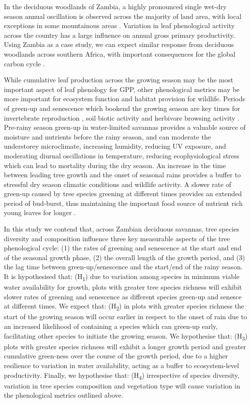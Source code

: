 \documentclass[11pt,a4paper]{article}
\begin{document}
In the deciduous woodlands of Zambia, a highly pronounced single wet-dry season annual oscillation is observed across the majority of land area, with local exceptions in some mountainous areas \citep{}. Variation in leaf phenological activity across the country has a large influence on annual gross primary productivity. Using Zambia as a case study, we can expect similar response from deciduous woodlands across southern Africa, with important consequences for the global carbon cycle \citep{}. 

While cumulative leaf production across the growing season may be the most important aspect of leaf phenology for GPP, other phenological metrics may be more important for ecosystem function and habitat provision for wildlife. Periods of green-up and senescence which bookend the growing season are key times for invertebrate reproduction \citep{}, soil biotic activity \citep{} and herbivore browsing activity \citep{}. Pre-rainy season green-up in water-limited savannas provides a valuable source of moisture and nutrients before the rainy season, and can moderate the understorey microclimate, increasing humidity, reducing UV exposure, and moderating diurnal oscillations in temperature, reducing ecophysiological stress which can lead to mortality during the dry season. An increase in the time between leading tree growth and the onset of seasonal rains provides a buffer to stressful dry season climatic conditions and wildlife activity. A slower rate of green-up caused by tree species greening at different times provides an extended period of bud-burst, thus maintaining the important food source of nutrient rich young leaves for longer \citep{}.
 
In this study we contend that, across Zambian deciduous savannas, tree species diversity and composition influence three key measurable aspects of the tree phenological cycle: (1) the rates of greening and senescence at the start and end of the seasonal growth phase, (2) the overall length of the growth period, and (3) the lag time between green-up/senescence and the start/end of the rainy season. It is hypothesised that: (H\textsubscript{1}) due to variation among species in minimum viable water availability for growth, plots with greater tree species richness will exhibit slower rates of greening and senescence as different species green-up and senesce at different times. We expect that: (H\textsubscript{2}) in plots with greater species richness the start of the growing season will occur earlier in respect to the onset of rain due to an increased likelihood of containing a species which can green-up early, facilitating other species to initiate the growing season. We hypothesise that: (H\textsubscript{3}) plots with greater species richness will exhibit a longer growth period and greater cumulative green-ness over the course of the growth period, due to a higher resilience to variation in water availability, acting as a buffer to ecosystem-level productivity. Finally, we hypothesise that: (H\textsubscript{4}) irrespective of species diversity, variation in tree species composition and vegetation type will cause variation in the phenological metrics outlined above. 
\end{document}
